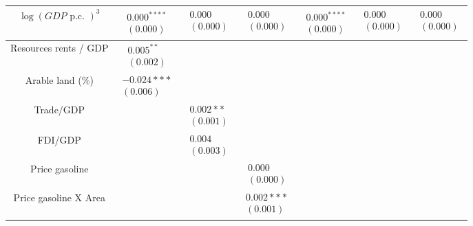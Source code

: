 \documentclass[10pt]{article}
\begin{document}
\begin{center}
\begin{tabular}{|c|c|c|c|c|c|c|}
$\log (G D P \text { p.c. })^{3}$ & $\begin{array}{l}0.000^{* * * *} \\ (0.000)\end{array}$ & $\begin{array}{l}0.000 \\ (0.000)\end{array}$ & $\begin{array}{l}0.000 \\ (0.000)\end{array}$ & $\begin{array}{l}0.000^{* * * *} \\ (0.000)\end{array}$ & $\begin{array}{l}0.000 \\ (0.000)\end{array}$ & $\begin{array}{l}0.000 \\ (0.000)\end{array}$ \\
\hline
Resources rents / GDP & $\begin{array}{l}0.005^{* *} \\ (0.002)\end{array}$ &  &  &  &  &  \\
\hline
Arable land (\%) & $\begin{array}{l}-0.024 * * * \\ (0.006)\end{array}$ &  &  &  &  &  \\
\hline
Trade/GDP &  & $\begin{array}{l}0.002 * * \\ (0.001)\end{array}$ &  &  &  &  \\
\hline
FDI/GDP &  & $\begin{array}{l}0.004 \\ (0.003)\end{array}$ &  &  &  &  \\
\hline
Price gasoline &  &  & $\begin{array}{l}0.000 \\ (0.000)\end{array}$ &  &  &  \\
\hline
Price gasoline X Area &  &  & $\begin{array}{l}0.002 * * * \\ (0.001)\end{array}$ &  &  &  \\

\end{tabular}
\end{center}
\end{document}
